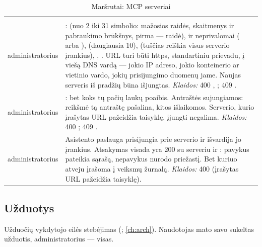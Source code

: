 \begin{xltabular}{\textwidth}{@{}L{19mm}Y@{}}
\caption{Maršrutai: MCP serveriai}\label{tab:api:mcp}\\
\toprule {} &  \\ \midrule \endfirsthead
\toprule {} &  \\ \midrule \endhead
\bottomrule \endlastfoot
{}
administratorius & :  (nuo 2 iki 31 simbolio: mažosios raidės, skaitmenys ir
  pabraukimo brūkšnys, pirma --- raidė),  ir neprivalomai  (
  arba ),  (daugiausia 10),  (tuščias reiškia visus
  serverio įrankius), , . URL turi būti https, standartiniu
  prievadu, į viešą DNS vardą --- jokio IP adreso, jokio konteinerio ar vietinio vardo, jokių
  prisijungimo duomenų jame. Naujas serveris iš pradžių būna išjungtas. \emph{Klaidos:} 400
  , ; 409 . \\
\addlinespace
{}
administratorius & : bet koks tų pačių laukų poaibis. Antraštės sujungiamos:
  reikšmė  tą antraštę pašalina, kitos išlaikomos. Serverio, kurio įrašytas URL
  pažeidžia taisyklę, įjungti negalima. \emph{Klaidos:} 400 ; 409
  . \\
\addlinespace
{}
administratorius & Asistento paslauga prisijungia prie serverio ir išvardija jo įrankius.
  Atsakymas visada yra 200 su serveriu ir : pavykus  pateikia sąrašą,
  nepavykus  nurodo priežastį. Bet kuriuo atveju įrašoma į veiksmų žurnalą.
  \emph{Klaidos:} 400  (įrašytas URL pažeidžia taisyklę). \\
\end{xltabular}

\subsection{Užduotys}\label{sec:api:jobs}

Užduočių vykdytojo eilės stebėjimas (; \cref{ch:arch}). Naudotojas mato
savo sukeltas užduotis, administratorius --- visas.

